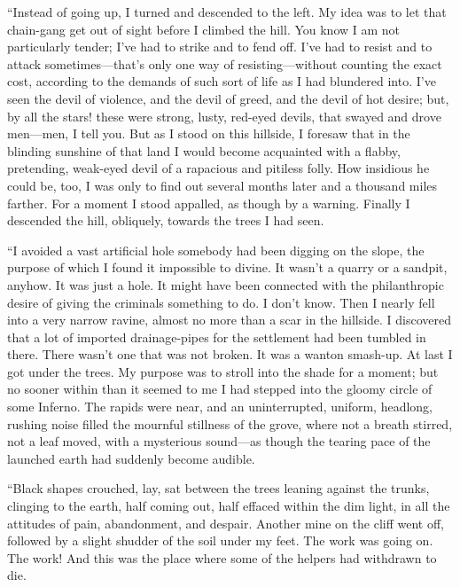 \documentclass[12pt]{report}
\begin{document}
``Instead of going up, I turned and descended to the left. My idea was
to let that chain-gang get out of sight before I climbed the hill. You
know I am not particularly tender; I've had to strike and to fend off.
I've had to resist and to attack sometimes---that's only one way of
resisting---without counting the exact cost, according to the demands of
such sort of life as I had blundered into. I've seen the devil of
violence, and the devil of greed, and the devil of hot desire; but, by
all the stars! these were strong, lusty, red-eyed devils, that swayed
and drove men---men, I tell you. But as I stood on this hillside, I
foresaw that in the blinding sunshine of that land I would become
acquainted with a flabby, pretending, weak-eyed devil of a rapacious and
pitiless folly. How insidious he could be, too, I was only to find out
several months later and a thousand miles farther. For a moment I stood
appalled, as though by a warning. Finally I descended the hill,
obliquely, towards the trees I had seen.

``I avoided a vast artificial hole somebody had been digging on the
slope, the purpose of which I found it impossible to divine. It wasn't a
quarry or a sandpit, anyhow. It was just a hole. It might have been
connected with the philanthropic desire of giving the criminals
something to do. I don't know. Then I nearly fell into a very narrow
ravine, almost no more than a scar in the hillside. I discovered that a
lot of imported drainage-pipes for the settlement had been tumbled in
there. There wasn't one that was not broken. It was a wanton smash-up.
At last I got under the trees. My purpose was to stroll into the shade
for a moment; but no sooner within than it seemed to me I had stepped
into the gloomy circle of some Inferno. The rapids were near, and an
uninterrupted, uniform, headlong, rushing noise filled the mournful
stillness of the grove, where not a breath stirred, not a leaf moved,
with a mysterious sound---as though the tearing pace of the launched
earth had suddenly become audible.

``Black shapes crouched, lay, sat between the trees leaning against the
trunks, clinging to the earth, half coming out, half effaced within the
dim light, in all the attitudes of pain, abandonment, and despair.
Another mine on the cliff went off, followed by a slight shudder of the
soil under my feet. The work was going on. The work! And this was the
place where some of the helpers had withdrawn to die.
\end{document}

